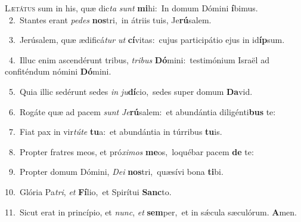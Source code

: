 \lettrine{\initial\textcolor{\initialcolor}{L}}{ætátus} sum in his, quæ dic\textit{ta} \textit{sunt} \textbf{mi}\-hi:~\star In domum Dómini \textbf{í}\-bimus.\\
{\numbfont\textcolor{\numbcolor}{~2.}}~Stantes erant \textit{pe}\-\textit{des} \textbf{nos}\-tri,~\star in átriis tuis, Je\-\textbf{rú}\-salem.\par
{\numbfont\textcolor{\numbcolor}{~3.}}~Jerúsalem, quæ ædificá\textit{tur} \textit{ut} \textbf{cí}\-vitas:~\star cujus participátio ejus in id\-\textbf{íp}\-sum.\par
{\numbfont\textcolor{\numbcolor}{~4.}}~Illuc enim ascendérunt tribus, \textit{tri}\-\textit{bus} \textbf{Dó}\-mini:~\star testimónium Israël ad confiténdum nómini \textbf{Dó}\-mini.\par
{\numbfont\textcolor{\numbcolor}{~5.}}~Quia illic sedérunt sedes \textit{in} \textit{ju}\-\textbf{dí}cio,~\star sedes super domum \textbf{Da}\-vid.\par
{\numbfont\textcolor{\numbcolor}{~6.}}~Rogáte quæ ad pacem \textit{sunt} \textit{Je}\-\textbf{rú}salem:~\star et abundántia diligénti\textbf{bus} te:\par
{\numbfont\textcolor{\numbcolor}{~7.}}~Fiat pax in vir\-\textit{tú}\-\textit{te} \textbf{tu}\-a:~\star et abundántia in túrribus \textbf{tu}\-is.\par
{\numbfont\textcolor{\numbcolor}{~8.}}~Propter fratres meos, et pró\-\textit{xi}\-\textit{mos} \textbf{me}\-os,~\star loquébar pacem \textbf{de} te:\par
{\numbfont\textcolor{\numbcolor}{~9.}}~Propter domum Dómini, \textit{De}\-\textit{i} \textbf{nos}\-tri,~\star quæsívi bona \textbf{ti}\-bi.\par
{\numbfont\textcolor{\numbcolor}{10.}}~Glória Pa\-\textit{tri}\-, \textit{et} \textbf{Fí}\-lio,~\star et Spirítui \textbf{Sanc}\-to.\par
{\numbfont\textcolor{\numbcolor}{11.}}~Sicut erat in princípio, et \textit{nunc}\-, \textit{et} \textbf{sem}\-per,~\star et in sǽcula sæculórum. \textbf{A}\-men.\par
